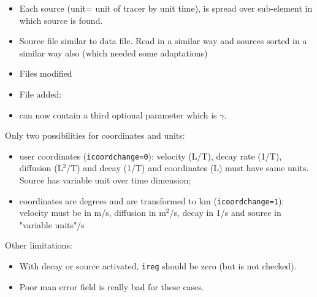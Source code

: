 \begin{itemize}
\item
Each source (unit= unit of tracer by unit time), is spread over sub-element in which source is found.
\item
Source file  similar to data file. Read in a similar way and sources sorted in a similar way also (which needed some adaptations)
\item Files modified
\item File added: 
\item {} can now contain a third optional parameter which is $\gamma$.
\end{itemize}

Only two possibilities for coordinates and units:
\begin{itemize}
\item user coordinates ({\tt icoordchange=0}): velocity (L/T), decay rate (1/T), diffusion (L$^2$/T) and decay (1/T) and coordinates (L) must have same units. Source has variable unit over time dimension;
\item coordinates are degrees and are transformed to km ({\tt icoordchange=1}): velocity must be in m/s, diffusion in m$^2$/s, decay in 1/s and source in "variable units"/s
\end{itemize}
Other limitations: 
\begin{itemize}
\item
With decay or source activated, {\tt ireg} should be zero (but is not checked).
\item
Poor man error field is really bad for these cases.
\end{itemize}

%
%



